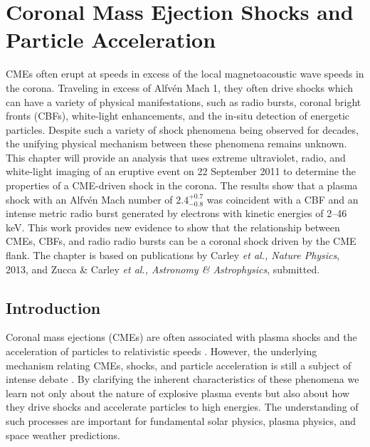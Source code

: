 \vspace{-5mm}
\singlespacing
\chapter{Coronal Mass Ejection Shocks and Particle Acceleration} 
\label{chap:5}
\doublespacing
\vspace{-10mm}
CMEs often erupt at speeds in excess of the local magnetoacoustic wave speeds in the corona. Traveling in excess of Alfv\'{e}n Mach 1, they often drive shocks which can have a variety of physical manifestations, such as radio bursts, coronal bright fronts (CBFs), white-light enhancements, and the in-situ detection of energetic particles. Despite such a variety of shock phenomena being observed for decades, the unifying physical mechanism between these phenomena remains unknown. This chapter will provide an analysis that uses extreme ultraviolet, radio, and white-light imaging of an eruptive event on 22 September 2011 to determine the properties of a CME-driven shock in the corona. The results show that a plasma shock with an Alfv\'{e}n Mach number of $2.4^{+0.7}_{-0.8}$ was coincident with a CBF and an intense metric radio burst generated by electrons with kinetic energies of 2--46 keV. This work provides new evidence to show that the relationship between CMEs, CBFs, and radio radio bursts can be a coronal shock driven by the CME flank. The chapter is based on publications by Carley {\it et al., Nature Physics}, 2013, and Zucca \& Carley {\it et al.,  Astronomy \& Astrophysics}, submitted.

\doublespacing
\section{Introduction}\label{sec:1}
Coronal mass ejections (CMEs) 
are often associated with plasma shocks and the acceleration of particles to relativistic speeds \citep{klassen2002, grechnev2011}. However, the underlying mechanism relating CMEs, shocks, and particle acceleration is still a subject of intense debate \citep{vrsnak2008}. By clarifying the inherent characteristics of these phenomena we learn not only about the nature of explosive plasma events but also about how they drive shocks and accelerate particles to high energies. The understanding of such processes are important for fundamental solar physics, plasma physics, and space weather predictions.

